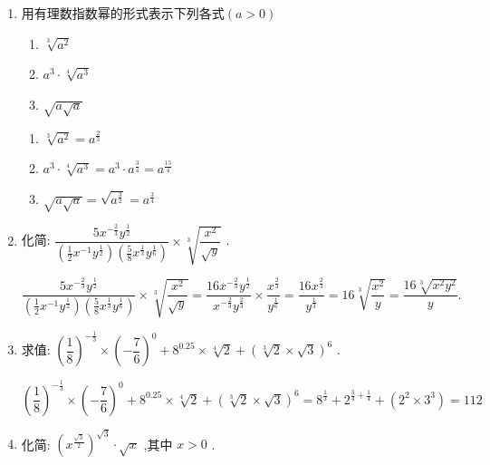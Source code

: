 \begin{enumerate}
    \item 用有理数指数幂的形式表示下列各式$(a > 0)$
    \begin{enumerate}
        \item $\sqrt[3]{a^2}$
        \item $a^3 \cdot \sqrt[4]{a^3}$
        \item $\sqrt{a\sqrt{a}}$
    \end{enumerate}
    \begin{jieda}
        \begin{enumerate}
            \item $\sqrt[3]{a^2} = a^{\frac{2}{3}}$
            \item $a^3 \cdot \sqrt[4]{a^3} = a^3 \cdot a^{\frac{3}{4}} = a^{\frac{15}{4}}$
            \item $\sqrt{a\sqrt{a}} = \sqrt{a^{\frac{3}{2}}} = a^{\frac{3}{4}}$
        \end{enumerate}
    \end{jieda}
    \item 化简: $\dfrac{5{x}^{-\frac{2}{3}}{y}^{\frac{1}{2}}}{\left( {\frac{1}{2}{x}^{-1}{y}^{\frac{1}{2}}}\right) \left( {\frac{5}{8}{x}^{\frac{1}{3}}{y}^{\frac{1}{6}}}\right) } \times  \sqrt[3]{\dfrac{{x}^{2}}{\sqrt{y}}}$ .
    \begin{jieda}
        $\dfrac{5{x}^{-\frac{2}{3}}{y}^{\frac{1}{2}}}{\left( {\frac{1}{2}{x}^{-1}{y}^{\frac{1}{2}}}\right) \left( {\frac{5}{8}{x}^{\frac{1}{3}}{y}^{\frac{1}{6}}}\right) } \times  \sqrt[3]{\dfrac{{x}^{2}}{\sqrt{y}}} = \dfrac{{16}{x}^{-\frac{2}{3}}{y}^{\frac{1}{2}}}{{x}^{-\frac{2}{3}}{y}^{\frac{2}{3}}} \times  \dfrac{{x}^{\frac{2}{3}}}{{y}^{\frac{1}{6}}} = \dfrac{{16}{x}^{\frac{2}{3}}}{{y}^{\frac{1}{3}}} = {16}\sqrt[3]{\dfrac{{x}^{2}}{y}} = \dfrac{{16}\sqrt[3]{{x}^{2}{y}^{2}}}{y}.$
    \end{jieda}
    \item 求值: ${\left( \dfrac{1}{8}\right) }^{-\frac{1}{3}} \times  {\left( -\dfrac{7}{6}\right) }^{0} + {8}^{0.25} \times  \sqrt[4]{2} + {\left( \sqrt[3]{2} \times  \sqrt{3}\right) }^{6}$ .
    \begin{jieda}
        ${\left( \dfrac{1}{8}\right) }^{-\frac{1}{3}} \times  {\left( -\dfrac{7}{6}\right) }^{0} + {8}^{0.25} \times  \sqrt[4]{2} + {\left( \sqrt[3]{2} \times  \sqrt{3}\right) }^{6} = {8}^{\frac{1}{3}} + {2}^{\frac{3}{4} + \frac{1}{4}} + \left( {{2}^{2} \times  {3}^{3}}\right)  = {112}$
    \end{jieda}
    \item 化简: ${\left( {x}^{\frac{\sqrt{3}}{2}}\right) }^{\sqrt{3}} \cdot  \sqrt{x}$ ,其中 $x > 0$ .

\end{enumerate}
